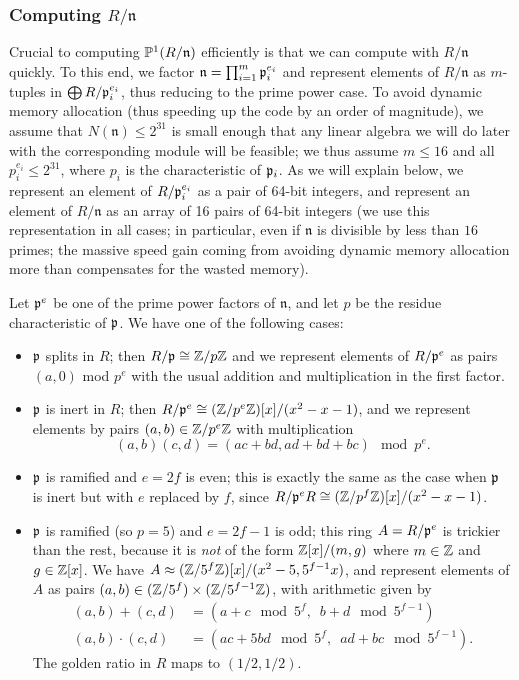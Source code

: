 \documentclass{amsart}
\newcommand{\n}{\mathfrak{n}}
\begin{document}
\subsubsection{Computing $R/\n$}
Crucial to computing $\P^1(R/\n)$ efficiently is that we can compute
with $R/\n$ quickly.  To this end, we factor $\n = \prod_{i=1}^m
\p_i^{e_i}$ and represent elements of $R/\n$ as $m$-tuples in
$\bigoplus R/\mathfrak{p}_i^{e_i}$, thus reducing to the prime power case.  To
avoid dynamic memory allocation (thus speeding up the code by an order
of magnitude), we assume that $N(\n)\leq 2^{31}$ is small enough that
any linear algebra we will do later with the corresponding module will
be feasible; we thus assume $m\leq 16$ and all $p_i^{e_i}\leq 2^{31}$,
where $p_i$ is the characteristic of $\mathfrak{p}_i$.  As we will explain
below, we represent an element of $R/\mathfrak{p}_i^{e_i}$ as a pair of 64-bit
integers, and represent an element of $R/\n$ as an array of 16 pairs
of 64-bit integers (we use this representation in all cases; in
particular, even if $\n$ is divisible by less than $16$ primes; the
massive speed gain coming from avoiding dynamic memory allocation more
than compensates for the wasted memory).

Let $\mathfrak{p}^e$ be one of the prime power factors of $\n$, and let $p$ be the residue
characteristic of $\mathfrak{p}$. We have one of the following cases:
\begin{itemize}
\item $\mathfrak{p}$ splits in $R$; then $R/\mathfrak{p}\cong \mathbb{Z}/p\mathbb{Z}$ and we represent elements
of $R/\mathfrak{p}^e$ as pairs $(a,0)$ mod $p^e$ with the usual addition and multiplication
in the first factor.
\item $\mathfrak{p}$ is inert in $R$; then $R/\mathfrak{p}^e\cong (\mathbb{Z}/p^e\mathbb{Z})[x]/(x^2-x-1)$,
and we represent elements by pairs $(a,b) \in \mathbb{Z}/p^e\mathbb{Z}$ with multiplication
$$(a,b)(c,d) = (ac+bd,ad+bd+bc) \mod p^e.$$
\item $\mathfrak{p}$ is ramified and $e=2f$ is even; this is exactly the
same as the case when $\mathfrak{p}$ is inert but with $e$ replaced by $f$,
since $R/\mathfrak{p}^eR \cong (\mathbb{Z}/p^{f}\mathbb{Z})[x]/(x^2-x-1)$.
\item $\mathfrak{p}$ is ramified (so $p=5$) and $e=2f-1$ is odd; this ring $A=R/\mathfrak{p}^e$
  is trickier than the rest, because it is {\em not} of the form
  $\mathbb{Z}[x]/(m,g)$ where $m\in\mathbb{Z}$ and $g \in\mathbb{Z}[x]$.  We have $A \approx
  (\mathbb{Z}/5^f\mathbb{Z})[x]/(x^2-5, 5^{f-1}x)$, and represent elements of $A$ as
  pairs $(a,b) \in (\mathbb{Z}/5^f)\times (\mathbb{Z}/5^{f-1}\mathbb{Z})$, with arithmetic
  given by
\begin{align*}
(a,b) + (c,d) &= (a+c \mod 5^f,\,\,\, b+d \mod 5^{f-1})\\
(a,b)\cdot (c,d) &= (ac+5bd \mod 5^f,\,\,\, ad+bc \mod 5^{f-1}).
\end{align*}
The golden ratio in $R$ maps to $(1/2,1/2)$.
\end{itemize}
\end{document}
